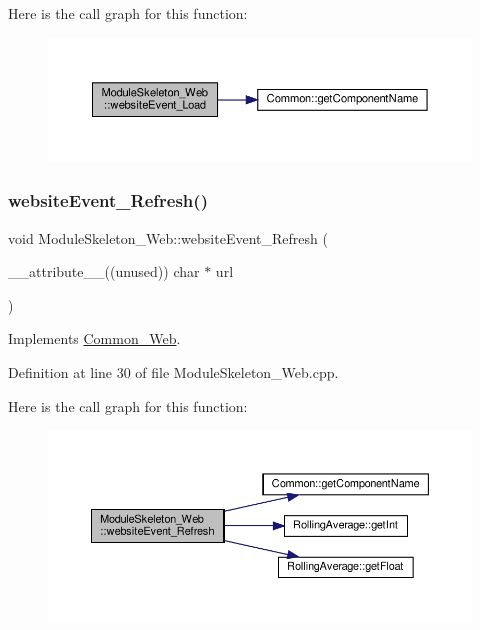 Here is the call graph for this function\+:
\nopagebreak
\begin{figure}[H]
\begin{center}
\leavevmode
\includegraphics[width=350pt]{class_module_skeleton___web_a391e4cad5fa897f0b57e3992c68eac14_cgraph}
\end{center}
\end{figure}
\mbox{\label{class_module_skeleton___web_a4fbb767613efc275f91eac8e550f1a86}} 
\subsubsection{\texorpdfstring{website\+Event\+\_\+\+Refresh()}{websiteEvent\_Refresh()}}
{\footnotesize\ttfamily void Module\+Skeleton\+\_\+\+Web\+::website\+Event\+\_\+\+Refresh (\begin{DoxyParamCaption}\item[{\+\_\+\+\_\+attribute\+\_\+\+\_\+((unused)) char $\ast$}]{url }\end{DoxyParamCaption})\hspace{0.3cm}{\ttfamily [virtual]}}



Implements \hyperlink{class_common___web_aaca7c54fdcf908e4e1256b7b1f6fc212}{Common\+\_\+\+Web}.



Definition at line 30 of file Module\+Skeleton\+\_\+\+Web.\+cpp.

Here is the call graph for this function\+:
\nopagebreak
\begin{figure}[H]
\begin{center}
\leavevmode
\includegraphics[width=350pt]{class_module_skeleton___web_a4fbb767613efc275f91eac8e550f1a86_cgraph}
\end{center}
\end{figure}


